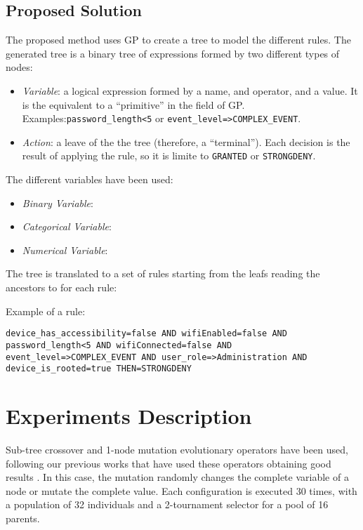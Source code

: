 \documentclass[runningheads,a4paper]{llncs}
\begin{document}
\subsection{Proposed Solution}
\label{subsec:solution}

The proposed method uses GP to create a tree to model the different rules. The generated tree
is a binary tree of expressions formed by two different types of nodes:

\begin{itemize}
\item {\em Variable}: a logical expression formed by a name, and operator, and a value. It is the equivalent to a ``primitive'' in the field of GP. Examples:\texttt{password\_length<5} or \texttt{event\_level=>COMPLEX\_EVENT}.
\item {\em Action}: a leave of the the tree (therefore, a ``terminal''). Each decision is the result of applying the rule, so it is limite to \texttt{GRANTED} or \texttt{STRONGDENY}.
\end{itemize}

The different variables have been used:

\begin{itemize}
\item {\em Binary Variable}: %
\item {\em Categorical Variable}: 
\item {\em Numerical Variable}: 

\end{itemize}

The tree is translated to a set of rules starting from the leafs reading the ancestors to for each rule:

Example of a rule: %

\begin{verbatim}
device_has_accessibility=false AND wifiEnabled=false AND 
password_length<5 AND wifiConnected=false AND
event_level=>COMPLEX_EVENT AND user_role=>Administration AND
device_is_rooted=true THEN=STRONGDENY 
\end{verbatim}

\section{Experiments Description}
\label{sec:experiments}

Sub-tree crossover and 1-node mutation evolutionary operators have been used, following our previous works that have used these operators obtaining good results \cite{CITAR_AQUI_EVOSTAR14GPBOT}. In this case, the mutation randomly changes the complete variable of a node or mutate the complete value. Each configuration is executed 30 times, with a population of 32 individuals and a 2-tournament selector for a pool of 16 parents.
\end{document}
